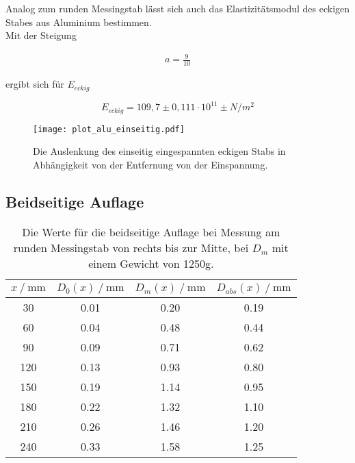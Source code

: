 Analog zum runden Messingstab lässt sich auch das Elastizitätsmodul des eckigen Stabes aus Aluminium bestimmen.\\
Mit der Steigung 

\begin{align*}
  a = \frac{9}{10}
\end{align*}

ergibt sich für $E_{eckig}$ 

\begin{equation*}
  E_{eckig} =  109,7 \pm 0,111 \cdot 10^{11} \pm N/m^2            
\end{equation*}


\begin{figure}[H]
  \centering
  \texttt{[image: plot\_alu\_einseitig.pdf]}
  \caption{Die Auslenkung des einseitig eingespannten eckigen Stabs in Abhängigkeit 
  von der Entfernung von der Einspannung.}
  \label{fig:plot_alu_einseitig}
\end{figure}


\subsection{Beidseitige Auflage}  %
\label{subsec:Beiseitige Auflage}


\begin{table}[H]
  \centering
  \caption{Die Werte für die beidseitige Auflage bei Messung am runden Messingstab von rechts bis zur Mitte, bei $D_m$ mit 
  einem Gewicht von 1250g.}
  \begin{tabular}{cccc}
    \toprule
    {$x \mathbin{/} \unit{\milli\metre}$} &
    {$D_0(x) \mathbin{/} \unit{\milli\metre}$} &
    {$D_m(x) \mathbin{/} \unit{\milli\metre}$} &
    {$D_{abs}(x) \mathbin{/} \unit{\milli\metre}$} \\
    \midrule
     30 & 0.01 & 0.20 & 0.19 \\  
     60 & 0.04 & 0.48 & 0.44 \\
     90 & 0.09 & 0.71 & 0.62 \\
    120 & 0.13 & 0.93 & 0.80 \\
    150 & 0.19 & 1.14 & 0.95 \\
    180 & 0.22 & 1.32 & 1.10 \\
    210 & 0.26 & 1.46 & 1.20 \\
    240 & 0.33 & 1.58 & 1.25 \\
    
    \bottomrule
  \end{tabular}
  \label{tab:Tabelle5}
\end{table}




